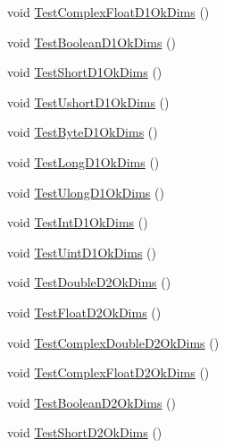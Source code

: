 \begin{DoxyCompactItemize}
\item 
void \mbox{\hyperlink{classkhiva_1_1array_1_1tests_1_1_array_tests_abfda4ef65b1ab8068e5d5d0d038b3190}{Test\+Complex\+Float\+D1\+Ok\+Dims}} ()
\item 
void \mbox{\hyperlink{classkhiva_1_1array_1_1tests_1_1_array_tests_a50e40c94a388df549d68a6e0cb372847}{Test\+Boolean\+D1\+Ok\+Dims}} ()
\item 
void \mbox{\hyperlink{classkhiva_1_1array_1_1tests_1_1_array_tests_a6417ef133741f905ab2215cdb542153b}{Test\+Short\+D1\+Ok\+Dims}} ()
\item 
void \mbox{\hyperlink{classkhiva_1_1array_1_1tests_1_1_array_tests_a0142d92c422e7e32d9ff94f85ca9a974}{Test\+Ushort\+D1\+Ok\+Dims}} ()
\item 
void \mbox{\hyperlink{classkhiva_1_1array_1_1tests_1_1_array_tests_a98a6965a945c065cf6fb7c9fe1053426}{Test\+Byte\+D1\+Ok\+Dims}} ()
\item 
void \mbox{\hyperlink{classkhiva_1_1array_1_1tests_1_1_array_tests_ae889f12ea658731d2018816453f2de2d}{Test\+Long\+D1\+Ok\+Dims}} ()
\item 
void \mbox{\hyperlink{classkhiva_1_1array_1_1tests_1_1_array_tests_a69d4ecf1b3869092d767f08c375f58cf}{Test\+Ulong\+D1\+Ok\+Dims}} ()
\item 
void \mbox{\hyperlink{classkhiva_1_1array_1_1tests_1_1_array_tests_a683d441627eaf48b2947eb6aead18253}{Test\+Int\+D1\+Ok\+Dims}} ()
\item 
void \mbox{\hyperlink{classkhiva_1_1array_1_1tests_1_1_array_tests_a8a749d29940d651f989d6109c4ba8d96}{Test\+Uint\+D1\+Ok\+Dims}} ()
\item 
void \mbox{\hyperlink{classkhiva_1_1array_1_1tests_1_1_array_tests_abdcc245dae55c9b79b786b3e238fe8d2}{Test\+Double\+D2\+Ok\+Dims}} ()
\item 
void \mbox{\hyperlink{classkhiva_1_1array_1_1tests_1_1_array_tests_ac711dbbee42fe7a33eb318a32aab115d}{Test\+Float\+D2\+Ok\+Dims}} ()
\item 
void \mbox{\hyperlink{classkhiva_1_1array_1_1tests_1_1_array_tests_aeceaa8569493aa72ce0767b3a22b8387}{Test\+Complex\+Double\+D2\+Ok\+Dims}} ()
\item 
void \mbox{\hyperlink{classkhiva_1_1array_1_1tests_1_1_array_tests_ab14d5364bd75fdd3c8b1b858f8de052e}{Test\+Complex\+Float\+D2\+Ok\+Dims}} ()
\item 
void \mbox{\hyperlink{classkhiva_1_1array_1_1tests_1_1_array_tests_a21a45e6527685b8583f6b092fbdac4d9}{Test\+Boolean\+D2\+Ok\+Dims}} ()
\item 
void \mbox{\hyperlink{classkhiva_1_1array_1_1tests_1_1_array_tests_a15ff724c8ed13335c58228ebb50d9102}{Test\+Short\+D2\+Ok\+Dims}} ()

\end{DoxyCompactItemize}
